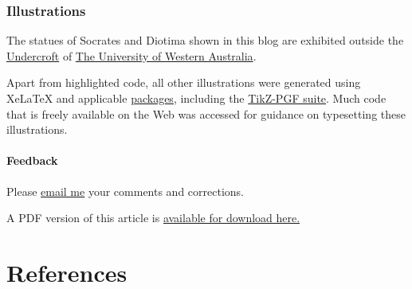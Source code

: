 \documentclass[
  12pt,
  british,
  a4paper,
]{article}
\begin{document}
\hypertarget{illustrations}{%
\subsubsection{Illustrations}\label{illustrations}}

The statues of Socrates and Diotima shown in this blog are exhibited
outside the
\href{https://www.uwa.edu.au/theatres/venues/undercroft}{Undercroft} of
\href{https://www.uwa.edu.au/}{The University of Western Australia}.

Apart from highlighted code, all other illustrations were generated
using XeLaTeX and applicable
\href{https://ctan.org/pkg?lang=en}{packages}, including the
\href{https://github.com/pgf-tikz/pgf}{TikZ-PGF suite}. Much code that
is freely available on the Web was accessed for guidance on typesetting
these illustrations.

\hypertarget{feedback}{%
\paragraph{Feedback}\label{feedback}}

Please \href{mailto:feedback.swanlotus@gmail.com}{email me} your
comments and corrections.

\noindent A PDF version of this article is
\href{./the-making-of-a-logo.pdf}{available for download here.}

\hypertarget{bibliography}{%
\section*{References}\label{bibliography}}
\end{document}
